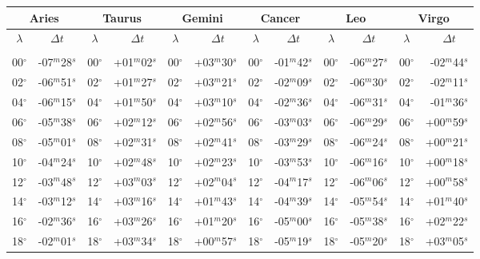 \begin{table}
\centering
{\small \begin{tabular}{cr|cr|cr|cr|cr|cr}
\multicolumn{2}{c}{Aries}\vline & \multicolumn{2}{c}{Taurus} \vline& \multicolumn{2}{c}{Gemini} \vline& \multicolumn{2}{c}{Cancer}\vline &
\multicolumn{2}{c}{Leo}\vline & \multicolumn{2}{c}{Virgo}\\\hline
$\lambda$& $\Delta t~~~~~$& $\lambda$& $\Delta t~~~~~$& $\lambda$& $\Delta t~~~~~$& $\lambda$& $\Delta t~~~~~$& $\lambda$& $\Delta t~~~~~$& $\lambda$& $\Delta t~~~~~$\\\hline
&&&&&&&&&&&\\[-2ex]
00$^\circ$ & -07$^m$28$^s$ & 00$^\circ$ & +01$^m$02$^s$ & 00$^\circ$ & +03$^m$30$^s$ & 00$^\circ$ & -01$^m$42$^s$ & 00$^\circ$ & -06$^m$27$^s$ & 00$^\circ$ & -02$^m$44$^s$\\
02$^\circ$ & -06$^m$51$^s$ & 02$^\circ$ & +01$^m$27$^s$ & 02$^\circ$ & +03$^m$21$^s$ & 02$^\circ$ & -02$^m$09$^s$ & 02$^\circ$ & -06$^m$30$^s$ & 02$^\circ$ & -02$^m$11$^s$\\
04$^\circ$ & -06$^m$15$^s$ & 04$^\circ$ & +01$^m$50$^s$ & 04$^\circ$ & +03$^m$10$^s$ & 04$^\circ$ & -02$^m$36$^s$ & 04$^\circ$ & -06$^m$31$^s$ & 04$^\circ$ & -01$^m$36$^s$\\
06$^\circ$ & -05$^m$38$^s$ & 06$^\circ$ & +02$^m$12$^s$ & 06$^\circ$ & +02$^m$56$^s$ & 06$^\circ$ & -03$^m$03$^s$ & 06$^\circ$ & -06$^m$29$^s$ & 06$^\circ$ & +00$^m$59$^s$\\
08$^\circ$ & -05$^m$01$^s$ & 08$^\circ$ & +02$^m$31$^s$ & 08$^\circ$ & +02$^m$41$^s$ & 08$^\circ$ & -03$^m$29$^s$ & 08$^\circ$ & -06$^m$24$^s$ & 08$^\circ$ & +00$^m$21$^s$\\
10$^\circ$ & -04$^m$24$^s$ & 10$^\circ$ & +02$^m$48$^s$ & 10$^\circ$ & +02$^m$23$^s$ & 10$^\circ$ & -03$^m$53$^s$ & 10$^\circ$ & -06$^m$16$^s$ & 10$^\circ$ & +00$^m$18$^s$\\
12$^\circ$ & -03$^m$48$^s$ & 12$^\circ$ & +03$^m$03$^s$ & 12$^\circ$ & +02$^m$04$^s$ & 12$^\circ$ & -04$^m$17$^s$ & 12$^\circ$ & -06$^m$06$^s$ & 12$^\circ$ & +00$^m$58$^s$\\
14$^\circ$ & -03$^m$12$^s$ & 14$^\circ$ & +03$^m$16$^s$ & 14$^\circ$ & +01$^m$43$^s$ & 14$^\circ$ & -04$^m$39$^s$ & 14$^\circ$ & -05$^m$54$^s$ & 14$^\circ$ & +01$^m$40$^s$\\
16$^\circ$ & -02$^m$36$^s$ & 16$^\circ$ & +03$^m$26$^s$ & 16$^\circ$ & +01$^m$20$^s$ & 16$^\circ$ & -05$^m$00$^s$ & 16$^\circ$ & -05$^m$38$^s$ & 16$^\circ$ & +02$^m$22$^s$\\
18$^\circ$ & -02$^m$01$^s$ & 18$^\circ$ & +03$^m$34$^s$ & 18$^\circ$ & +00$^m$57$^s$ & 18$^\circ$ & -05$^m$19$^s$ & 18$^\circ$ & -05$^m$20$^s$ & 18$^\circ$ & +03$^m$05$^s$\\

\end{tabular}}
\end{table}
